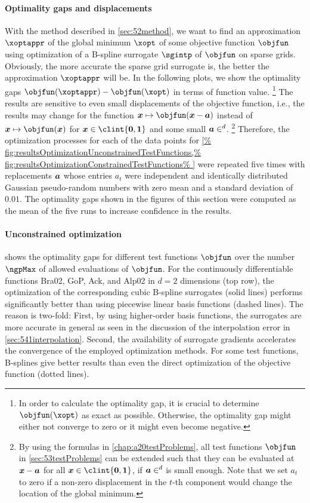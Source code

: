 \paragraph{Optimality gaps and displacements}

With the method described in \cref{sec:52method},
we want to find an approximation $\xoptappr$ of the
global minimum $\xopt$ of some objective function $\objfun$
using optimization of a B-spline surrogate $\sgintp$ of $\objfun$
on sparse grids.
Obviously, the more accurate the sparse grid surrogate is,
the better the approximation $\xoptappr$ will be.
In the following plots,
we show the optimality gaps $\objfun(\xoptappr) - \objfun(\xopt)$
in terms of function value.%
\footnote{%
  In order to calculate the optimality gap,
  it is crucial to determine $\objfun(\xopt)$ as exact as possible.
  Otherwise, the optimality gap might either not converge to zero
  or it might even become negative.%
}
The results are sensitive to even small displacements
of the objective function, i.e.,
the results may change for the
function $\*x \mapsto \objfun(\*x - \*a)$
instead of $\*x \mapsto \objfun(\*x)$ for $\*x \in \clint{\*0, \*1}$
and some small $\*a \in \real^d$.%
\footnote{%
  By using the formulas in \cref{chap:a20testProblems},
  all test functions $\objfun$ in \cref{sec:53testProblems}
  can be extended such that they can be evaluated at ${\boldsymbol{x}} - {\boldsymbol{a}}$
  for all $\*x \in \clint{\*0, \*1}$, if $\*a \in \real^d$ is small enough.
  Note that we set $a_t$ to zero if a non-zero displacement in
  the $t$-th component would change the location of the global minimum.%
}
Therefore, the optimization processes for each of the
data points for \cref{%
  fig:resultsOptimizationUnconstrainedTestFunctions,%
  fig:resultsOptimizationConstrainedTestFunctions%
}
were repeated five times with replacements ${\boldsymbol{a}}$
whose entries $a_t$ were independent and identically distributed Gaussian
pseudo-random numbers with zero mean and a standard deviation of $0.01$.
The optimality gaps shown in the figures of this section were computed
as the mean of the five runs to increase confidence in the results.

\paragraph{Unconstrained optimization}

shows the optimality gaps for different test functions $\objfun$
over the number $\ngpMax$ of allowed evaluations of $\objfun$.
For the continuously differentiable functions Bra02, GoP, Ack, and Alp02
in $d = 2$ dimensions (top row),
the optimization of the corresponding cubic B-spline surrogates (solid lines)
performs significantly better than using piecewise linear basis functions
(dashed lines).
The reason is two-fold:
First, by using higher-order basis functions, the surrogates are more accurate
in general as seen in the discussion of the interpolation error in
\cref{sec:541interpolation}.
Second, the availability of surrogate gradients accelerates the
convergence of the employed optimization methods.
For some test functions, B-splines give better results than even
the direct optimization of the objective function (dotted lines).

